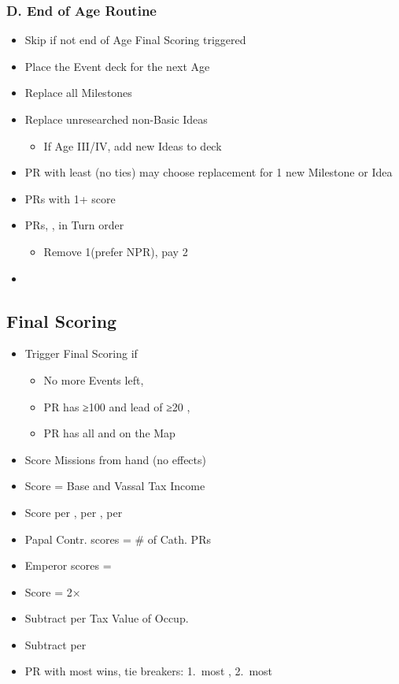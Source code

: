 \documentclass[10pt]{article}
\begin{document}
\subsubsection*{D. End of Age Routine}
\begin{itemize}
	\item Skip if not end of Age  Final Scoring triggered
	\item Place the Event deck for the next Age
	\item Replace all Milestones
	\item Replace unresearched non-Basic Ideas
	\begin{itemize}
		\item If Age III/IV, add new Ideas to deck
	\end{itemize}
	\item PR with least \prestige (no ties) may choose replacement for 1 new Milestone or Idea
	\item PRs with 1+ \marriage score 
	\item PRs, , in Turn order
	\begin{itemize}
		\item Remove 1\marriage (prefer NPR),  pay 2\diplopower
	\end{itemize}
	\item {}
\end{itemize}

\subsection*{Final Scoring}
\begin{itemize}
	\item Trigger Final Scoring  if
	\begin{itemize}
		\item No more Events left, 
		\item PR has ≥100 \prestige and lead of ≥20 \prestige, 
		\item PR has all \towns and \vassals on the Map
	\end{itemize}
	\item Score Missions from hand (no effects)
	\item Score \prestige = Base and Vassal Tax Income
	\item Score  per \core,  per \marriage,  per \alliance
	\item Papal Contr. scores \prestige = \# of Cath. PRs
	\item Emperor scores \prestige = \authority
	\item Score \prestige = 2× \stability
	\item Subtract  per Tax Value of Occup. \towns
	\item Subtract  per \interest
	\item PR with most \prestige wins, tie breakers: 1.~most \monarchpower, 2.~most \ducats%
\end{itemize}
\end{document}
